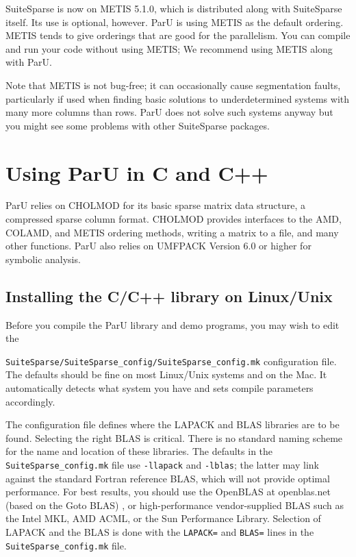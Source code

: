 \documentclass[12pt]{article}
\begin{document}
SuiteSparse is now on METIS 5.1.0, which is distributed along with
SuiteSparse itself.  Its use is optional, however. ParU is using METIS as the 
default ordering. METIS tends to give orderings that are good for the 
parallelism. You can compile and run your code without using METIS; We recommend 
using METIS along with ParU.

Note that METIS is not bug-free; it can occasionally cause segmentation 
faults, particularly if used when finding basic solutions to underdetermined 
systems with many more columns than rows. ParU does not solve such 
systems anyway but you might see some problems with other SuiteSparse packages.

\section{Using ParU in C and C++}

ParU relies on CHOLMOD for its basic sparse matrix data structure, a compressed 
sparse column format.  CHOLMOD provides interfaces to the AMD, COLAMD, and METIS
ordering methods, writing a matrix to a file, and many other
functions. ParU also relies on UMFPACK Version 6.0 or higher for symbolic 
analysis. 


\subsection{Installing the C/C++ library on Linux/Unix}

Before you compile the ParU library and demo programs, you may wish to
edit the 

\verb'SuiteSparse/SuiteSparse_config/SuiteSparse_config.mk' 
configuration file.  The defaults should be fine on most Linux/Unix systems and 
on the Mac.
It automatically detects what system you have and sets compile parameters
accordingly.

The configuration file defines where the LAPACK and BLAS libraries are to be
found.  Selecting the right BLAS is critical.  There is no standard naming
scheme for the name and location of these libraries.  The defaults in the
\verb'SuiteSparse_config.mk' file use \verb'-llapack' and \verb'-lblas';
the latter may link against the standard Fortran reference BLAS, which will not 
provide optimal performance.  For best results, you should use the OpenBLAS
at openblas.net
(based on the Goto BLAS)
\cite{GotoVanDeGeijn08}, or high-performance vendor-supplied BLAS such as the
Intel MKL, AMD ACML, or the Sun Performance Library.  Selection of LAPACK and
the BLAS is done with the \verb'LAPACK=' and \verb'BLAS=' lines in the
\verb'SuiteSparse_config.mk' file.
\end{document}
